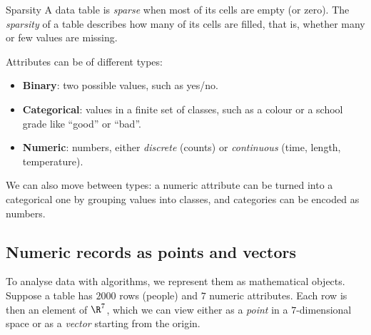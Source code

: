\documentclass[a4paper,12pt,oneside]{report}
\begin{document}
\begin{frameddefn}{Sparsity}\label{def:sparsity}
A data table is \emph{sparse} when most of its cells are empty (or
zero). The \emph{sparsity} of a table describes how many of its cells
are filled, that is, whether many or few values are missing.
\end{frameddefn}

Attributes can be of different types:
\begin{itemize}
  \item \textbf{Binary}: two possible values, such as yes/no.
  \item \textbf{Categorical}: values in a finite set of classes, such
    as a colour or a school grade like ``good'' or ``bad''.
  \item \textbf{Numeric}: numbers, either \emph{discrete} (counts) or
    \emph{continuous} (time, length, temperature).
\end{itemize}
We can also move between types: a numeric attribute can be turned into
a categorical one by grouping values into classes, and categories can
be encoded as numbers.

\subsection{Numeric records as points and vectors}

To analyse data with algorithms, we represent them as mathematical
objects. Suppose a table has $2000$ rows (people) and $7$ numeric
attributes. Each row is then an element of $\R^7$, which we can view
either as a \emph{point} in a $7$-dimensional space or as a
\emph{vector} starting from the origin.

\begin{center}
\end{center}
\end{document}
